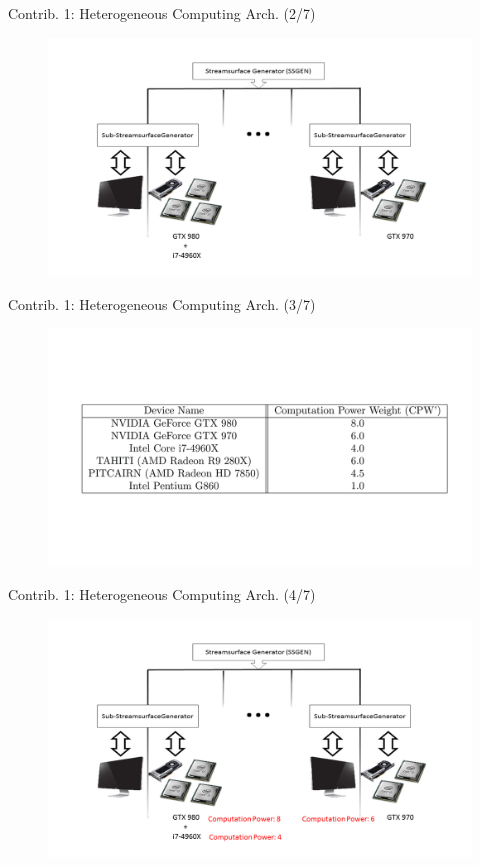 \documentclass{beamer}
\begin{document}
\begin{frame}{Contrib. 1: Heterogeneous Computing Arch. (2/7)}
	\begin{figure}
		\includegraphics[width=\linewidth]{figures/MAarch2.PNG}
	\end{figure}
\end{frame}

\begin{frame}{Contrib. 1: Heterogeneous Computing Arch. (3/7)}
	\begin{figure}
		\includegraphics[width=\linewidth]{figures/MAarch3.PNG}
	\end{figure}
\end{frame}

\begin{frame}{Contrib. 1: Heterogeneous Computing Arch. (4/7)}
	\begin{figure}
		\includegraphics[width=\linewidth]{figures/MAarch4.PNG}
	\end{figure}
\end{frame}
\end{document}
